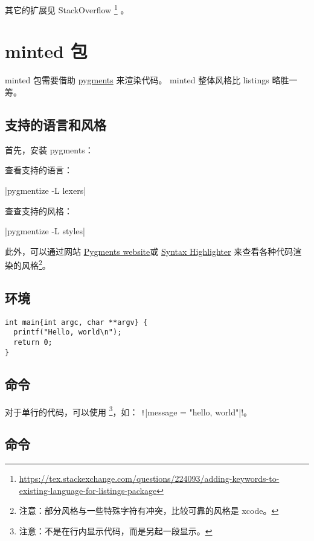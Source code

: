 其它的扩展见 StackOverflow
\footnote{\url{https://tex.stackexchange.com/questions/224093/adding-keywords-to-existing-language-for-listings-package}}
。

\section{minted 包}

minted 包需要借助 \href{https://pygments.org/}{pygments} 来渲染代码。
minted 整体风格比 listings 略胜一筹。

\subsection{支持的语言和风格}

首先，安装 pygments：


查看支持的语言：

|pygmentize -L lexers|

查查支持的风格：

|pygmentize -L styles|

此外，可以通过网站
\href{https://pygments.org/demo/}{Pygments website}或
\href{https://thepythonguru.com/tools/pygments-demo/}{Syntax Highlighter}
来查看各种代码渲染的风格\footnote{注意：部分风格与一些特殊字符有冲突，比较可靠的风格是 xcode。}。

\subsection{\protect{} 环境}

\begin{verbatim}
int main{int argc, char **argv} {
  printf("Hello, world\n");
  return 0;
}
\end{verbatim}

\subsection{\protect{} 命令}

对于单行的代码，可以使用 
\footnote{注意：不是在行内显示代码，而是另起一段显示。}，如：
\texttt!|message = "hello, world"|!。

\subsection{\protect{} 命令}


